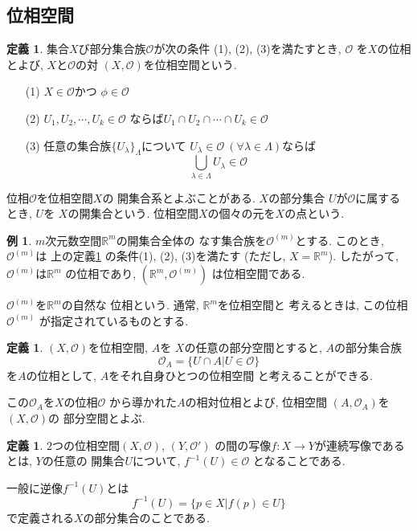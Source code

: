 \documentclass[a4j,12pt]{jarticle}
\theoremstyle{definition}
\newtheorem{definition}[theorem]{定義}
\newtheorem{example}[theorem]{例}
\begin{document}
\subsection{位相空間}
\begin{definition}\label{def:topological sapace}
    集合$X$び部分集合族$\mathcal{O}$が次の条件
    (1), (2), (3)を満たすとき, $\mathcal{O}$
    を$X$の位相とよび, $X$と$\mathcal{O}$の対
    $(X,\mathcal{O})$を位相空間という. 
    \begin{itemize}
        \item[(1)]$X\in \mathcal{O}$かつ
        $\phi \in \mathcal{O}$
        \item[(2)]
        $U_1,U_2, \cdots ,U_k\in \mathcal{O}$
        ならば$U_1\cap U_2\cap \cdots \cap U_k
        \in \mathcal{O}$
        \item[(3)]
        任意の集合族$\{U_\lambda\}_\Lambda$について
        $U_\lambda\in \mathcal{O}\ 
        (\forall \lambda \in \Lambda)$ならば
        $$\bigcup_{\lambda\in \Lambda}{U_\lambda}
        \in \mathcal{O}$$
    \end{itemize}
    位相$\mathcal{O}$を位相空間$X$の
    開集合系とよぶことがある. $X$の部分集合
    $U$が$\mathcal{O}$に属するとき, $U$を
    $X$の開集合という. 
    位相空間$X$の個々の元を$X$の点という. 
\end{definition}
\begin{example}
    $m$次元数空間$\mathbb{R}^m$の開集合全体の
    なす集合族を$\mathcal{O}^{(m)}$とする. 
    このとき, $\mathcal{O}^{(m)}$は
    上の定義\ref{def:topological sapace}
    の条件(1), (2), (3)を満たす
    (ただし, $X=\mathbb{R}^m$). したがって, 
    $\mathcal{O}^{(m)}$は$\mathbb{R}^m$
    の位相であり, $(\mathbb{R}^m, \mathcal{O}^{(m)})$
    は位相空間である.

    $\mathcal{O}^{(m)}$を$\mathbb{R}^m$の自然な
    位相という. 通常, $\mathbb{R}^m$を位相空間と
    考えるときは, この位相$\mathcal{O}^{(m)}$
    が指定されているものとする. 
\end{example}
\begin{definition}
    $(X, \mathcal{O})$を位相空間, $A$を
    $X$の任意の部分空間とすると, $A$の部分集合族
    $$\mathcal{O}_A=\{U\cap A|U\in \mathcal{O}\}$$
    を$A$の位相として, $A$をそれ自身ひとつの位相空間
    と考えることができる. 

    この$\mathcal{O}_A$を$X$の位相$\mathcal{O}$
    から導かれた$A$の相対位相とよび, 位相空間
    $(A,\mathcal{O}_A)$を$(X,\mathcal{O})$の
    部分空間とよぶ. 
\end{definition}
\begin{definition}\label{def:topological continuous map}
$2$つの位相空間$(X, \mathcal{O})$, $(Y,\mathcal{O}')$
の間の写像$f:X\to Y$が連続写像であるとは, $Y$の任意の
開集合$U$について, $f^{-1}(U)\in \mathcal{O}$
となることである. 

一般に逆像$f^{-1}(U)$とは
$$f^{-1}(U)=\{p\in X|f(p)\in U\}$$
で定義される$X$の部分集合のことである. 
\end{definition}
\end{document}
